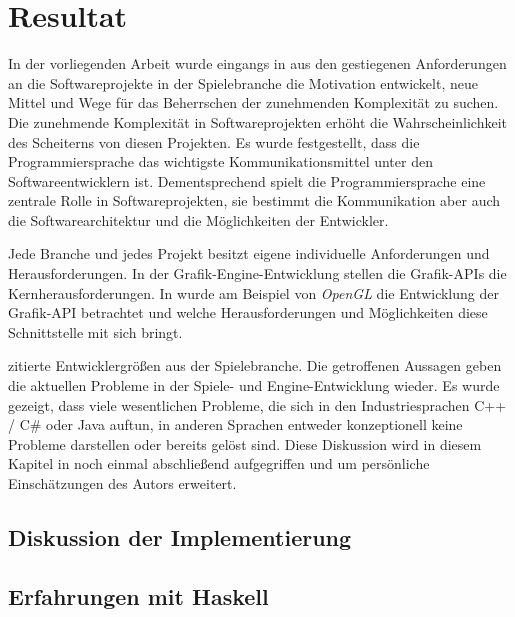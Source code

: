 \chapter{Resultat}
\label{chap:resultat}

In der vorliegenden Arbeit wurde eingangs in  aus den gestiegenen Anforderungen an die Softwareprojekte in der Spielebranche die Motivation entwickelt, neue Mittel und Wege für das Beherrschen der zunehmenden Komplexität zu suchen. Die zunehmende Komplexität in Softwareprojekten erhöht die Wahrscheinlichkeit des Scheiterns von diesen Projekten. Es wurde festgestellt, dass die Programmiersprache das wichtigste Kommunikationsmittel unter den Softwareentwicklern ist. Dementsprechend spielt die Programmiersprache eine zentrale Rolle in Softwareprojekten, sie bestimmt die Kommunikation aber auch die Softwarearchitektur und die Möglichkeiten der Entwickler.

Jede Branche und jedes Projekt besitzt eigene individuelle Anforderungen und Herausforderungen. In der Grafik-Engine-Entwicklung stellen die Grafik-\ac{API}s die Kernherausforderungen. In  wurde am Beispiel von \textit{OpenGL} die Entwicklung der Grafik-\ac{API} betrachtet und welche Herausforderungen und Möglichkeiten diese Schnittstelle mit sich bringt.

 zitierte Entwicklergrößen aus der Spielebranche. Die getroffenen Aussagen geben die aktuellen Probleme in der Spiele- und Engine-Entwicklung wieder. Es wurde gezeigt, dass viele wesentlichen Probleme, die sich in den Industriesprachen C++ / C# oder Java auftun, in anderen Sprachen entweder konzeptionell keine Probleme darstellen oder bereits gelöst sind. Diese Diskussion wird in diesem Kapitel in  noch einmal abschließend aufgegriffen und um persönliche Einschätzungen des Autors erweitert.


\section{Diskussion der Implementierung}

\section{Erfahrungen mit Haskell}\label{sec:xp-haskell}

